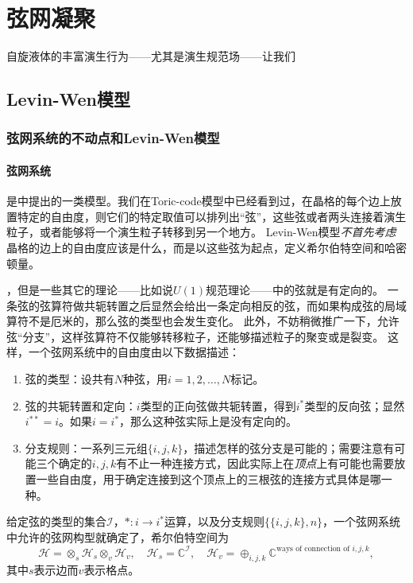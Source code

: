 \chapter{弦网凝聚}

自旋液体的丰富演生行为——尤其是演生规范场——让我们

\section{Levin-Wen模型}

\subsection{弦网系统的不动点和Levin-Wen模型}

\subsubsection{弦网系统}

是\cite{Levin_2005}中提出的一类模型。我们在Toric-code模型中已经看到过，在晶格的每个边上放置特定的自由度，则它们的特定取值可以排列出“弦”，这些弦或者两头连接着演生粒子，或者能够将一个演生粒子转移到另一个地方。
Levin-Wen模型\emph{不首先考虑}晶格的边上的自由度应该是什么，而是以这些弦为起点，定义希尔伯特空间和哈密顿量。

，但是一些其它的理论——比如说$U(1)$规范理论——中的弦就是有定向的。
一条弦的弦算符做共轭转置之后显然会给出一条定向相反的弦，而如果构成弦的局域算符不是厄米的，那么弦的类型也会发生变化。
此外，不妨稍微推广一下，允许弦“分支”，这样弦算符不仅能够转移粒子，还能够描述粒子的聚变或是裂变。
这样，一个弦网系统中的自由度由以下数据描述：
\begin{enumerate}
    \item 弦的类型：设共有$N$种弦，用$i=1, 2, \ldots, N$标记。
    \item 弦的共轭转置和定向：$i$类型的正向弦做共轭转置，得到$i^*$类型的反向弦；显然$i^{**}=i$。如果$i=i^*$，那么这种弦实际上是没有定向的。
    \item 分支规则：一系列三元组$\{i, j, k\}$，描述怎样的弦分支是可能的；需要注意有可能三个确定的$i, j, k$有不止一种连接方式，因此实际上在\emph{顶点}上有可能也需要放置一些自由度，用于确定连接到这个顶点上的三根弦的连接方式具体是哪一种。
\end{enumerate}
给定弦的类型的集合$\mathcal{I}$，$*: i \to i^*$运算，以及分支规则$\{ \{i, j, k\}, n \}$，一个弦网系统中允许的弦网构型就确定了，希尔伯特空间为
\begin{equation}
    \mathcal{H} = \otimes_s {\mathcal{H}_s} \otimes_v {\mathcal{H}_v}, \quad \mathcal{H}_s = \mathbb{C}^{\mathcal{I}}, \quad \mathcal{H}_v = \oplus_{i, j, k} \mathbb{C}^\text{ways of connection of $i, j, k$},
\end{equation}
其中$s$表示边而$v$表示格点。

